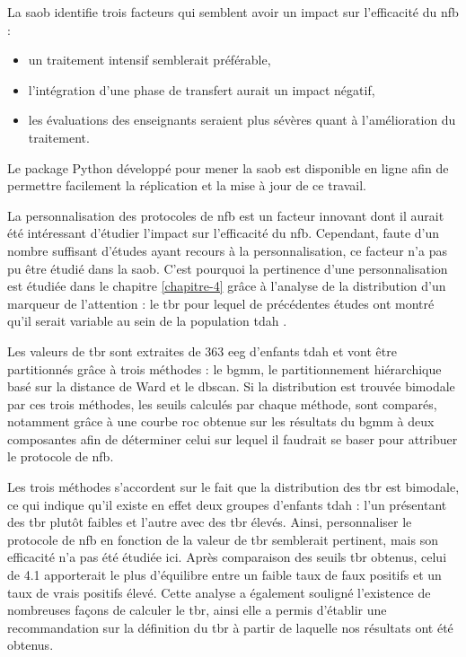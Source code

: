La \gls{saob} identifie trois facteurs qui semblent avoir un impact sur l'efficacité du \gls{nfb} : 
\begin{itemize}
\item un traitement intensif semblerait préférable, 
\item l'intégration d'une phase de transfert aurait un impact négatif, 
\item les évaluations des enseignants seraient plus
sévères quant à l'amélioration du traitement. 
\end{itemize}

Le package Python développé pour mener la \gls{saob} est disponible en ligne afin de permettre facilement la réplication et la mise à jour 
de ce travail. 

La personnalisation des protocoles de \gls{nfb} est un facteur innovant dont il aurait été intéressant d'étudier l'impact sur l'efficacité du \gls{nfb}.  
Cependant, faute d'un nombre suffisant d'études ayant recours à la personnalisation, ce facteur n'a pas pu être étudié dans la \gls{saob}. C'est pourquoi
la pertinence d'une personnalisation est étudiée dans le chapitre \ref{chapitre-4} grâce à l'analyse de la distribution d'un marqueur de l'attention : 
le \gls{tbr} pour lequel de précédentes études ont montré qu'il serait variable au sein de la population \gls{tdah} \citep{Zhang2017, Arns2013, Clarke2001}.

Les valeurs de \gls{tbr} sont extraites de 363 \gls{eeg} d'enfants \gls{tdah} et vont être partitionnés grâce à trois méthodes : le \gls{bgmm}, le partitionnement
hiérarchique basé sur la distance de Ward et le \gls{dbscan}. Si la distribution est trouvée bimodale par ces trois méthodes, les seuils calculés par chaque méthode,
sont comparés, notamment grâce à une courbe \gls{roc} obtenue sur
les résultats du \gls{bgmm} à deux composantes afin de déterminer celui sur lequel il faudrait se baser pour attribuer le protocole de \gls{nfb}.

Les trois méthodes s'accordent sur le fait que la distribution des \gls{tbr} est bimodale, ce qui indique qu'il existe en effet deux groupes d'enfants
\gls{tdah} : l'un présentant des \gls{tbr} plutôt faibles et l'autre avec des \gls{tbr} élevés. Ainsi, personnaliser le protocole de \gls{nfb} en 
fonction de la valeur de \gls{tbr} semblerait pertinent, mais son efficacité n'a pas été étudiée ici. Après comparaison des seuils \gls{tbr} obtenus, 
celui de 4.1 apporterait le plus d'équilibre entre 
un faible taux de faux positifs et un taux de vrais positifs élevé. Cette analyse a également souligné l'existence de nombreuses
façons de calculer le \gls{tbr}, ainsi elle a permis d'établir une recommandation sur la définition du \gls{tbr} à partir de laquelle nos
résultats ont été obtenus. 

